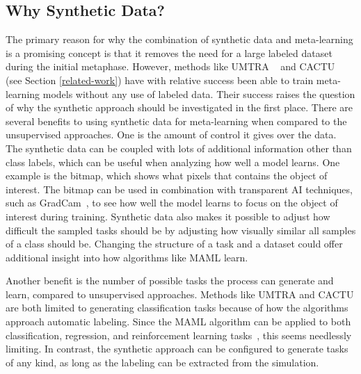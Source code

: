 
\subsection{Why Synthetic Data?}\label{why-synthetic}
The primary reason for why the combination of synthetic data and meta-learning is a promising concept is that it removes the need for a large labeled dataset during the initial metaphase. However, methods like UMTRA ~\cite{unsup-maml-rand} and CACTU~\cite{unsup-maml} (see Section \ref{related-work}) have with relative success been able to train meta-learning models without any use of labeled data. Their success raises the question of why the synthetic approach should be investigated in the first place. 
There are several benefits to using synthetic data for meta-learning when compared to the unsupervised approaches. One is the amount of control it gives over the data. The synthetic data can be coupled with lots of additional information other than class labels, which can be useful when analyzing how well a model learns. One example is the bitmap, which shows what pixels that contains the object of interest. The bitmap can be used in combination with transparent AI techniques, such as GradCam~\cite{gradcam}, to see how well the model learns to focus on the object of interest during training. Synthetic data also makes it possible to adjust how difficult the sampled tasks should be by adjusting how visually similar all samples of a class should be. Changing the structure of a task and a dataset could offer additional insight into how algorithms like \gls{MAML} learn.

Another benefit is the number of possible tasks the process can generate and learn, compared to unsupervised approaches. Methods like UMTRA and CACTU are both limited to generating classification tasks because of how the algorithms approach automatic labeling. Since the \gls{MAML} algorithm can be applied to both classification, regression, and reinforcement learning tasks~\cite{maml}, this seems needlessly limiting. In contrast, the synthetic approach can be configured to generate tasks of any kind, as long as the labeling can be extracted from the simulation.